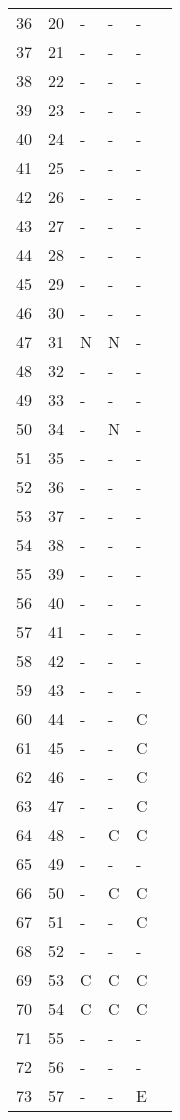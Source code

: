 \documentclass[10pt]{article}
\begin{document}
\begin{longtable}{llllll}
   36 & 20 & - & - & - &  \\ 
   37 & 21 & - & - & - &  \\ 
   38 & 22 & - & - & - &  \\ 
   39 & 23 & - & - & - &  \\ 
   40 & 24 & - & - & - &  \\ 
   41 & 25 & - & - & - &  \\ 
   42 & 26 & - & - & - &  \\ 
   43 & 27 & - & - & - &  \\ 
   44 & 28 & - & - & - &  \\ 
   45 & 29 & - & - & - &  \\ 
   46 & 30 & - & - & - &  \\ 
   47 & 31 & N & N & - &  \\ 
   48 & 32 & - & - & - &  \\ 
   49 & 33 & - & - & - &  \\ 
   50 & 34 & - & N & - &  \\ 
   51 & 35 & - & - & - &  \\ 
   52 & 36 & - & - & - &  \\ 
   53 & 37 & - & - & - &  \\ 
   54 & 38 & - & - & - &  \\ 
   55 & 39 & - & - & - &  \\ 
   56 & 40 & - & - & - &  \\ 
   57 & 41 & - & - & - &  \\ 
   58 & 42 & - & - & - &  \\ 
   59 & 43 & - & - & - &  \\ 
   60 & 44 & - & - & C &  \\ 
   61 & 45 & - & - & C &  \\ 
   62 & 46 & - & - & C &  \\ 
   63 & 47 & - & - & C &  \\ 
   64 & 48 & - & C & C &  \\ 
   65 & 49 & - & - & - &  \\ 
   66 & 50 & - & C & C &  \\ 
   67 & 51 & - & - & C &  \\ 
   68 & 52 & - & - & - &  \\ 
   69 & 53 & C & C & C &  \\ 
   70 & 54 & C & C & C &  \\ 
   71 & 55 & - & - & - &  \\ 
   72 & 56 & - & - & - &  \\ 
   73 & 57 & - & - & E &  \\ 

\end{longtable}
\end{document}
